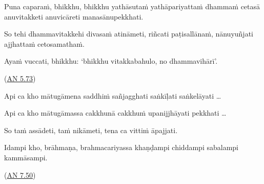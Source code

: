 \documentclass[11pt,oneside]{memoir}
\begin{document}
\begin{widecols}
Puna caparaṁ, bhikkhu, bhikkhu yathāsutaṁ yathāpariyattaṁ dhammaṁ cetasā
anuvitakketi anuvicāreti manasānupekkhati.

So tehi dhammavitakkehi divasaṁ atināmeti, riñcati paṭisallānaṁ, nānuyuñjati
ajjhattaṁ cetosamathaṁ.

Ayaṁ vuccati, bhikkhu: `bhikkhu vitakkabahulo, no dhammavihārī'.

(\href{https://suttacentral.net/an5.73/pli/ms}{AN 5.73})

Api ca kho mātugāmena saddhiṁ sañjagghati saṅkīḷati saṅkelāyati \ldots{}

Api ca kho mātugāmassa cakkhunā cakkhuṁ upanijjhāyati pekkhati \ldots{}

So taṁ assādeti, taṁ nikāmeti, tena ca vittiṁ āpajjati.

Idampi kho, brāhmaṇa, brahmacariyassa khaṇḍampi chiddampi sabalampi kammāsampi.

(\href{https://suttacentral.net/an7.50/pli/ms}{AN 7.50})

\columnbreak


\end{widecols}
\end{document}
